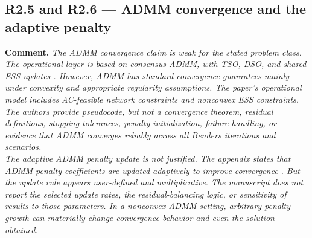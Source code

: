 \documentclass[11pt]{article}
\newcommand{\rcomment}[1]{\par\medskip\noindent\textbf{Comment.} \textit{#1}\par\smallskip}
\begin{document}
\subsection*{R2.5 and R2.6 --- ADMM convergence and the adaptive penalty}
\rcomment{
The ADMM convergence claim is weak for the stated problem class. The operational layer is based on consensus ADMM, with TSO, DSO, and shared ESS updates . However, ADMM has standard convergence guarantees mainly under convexity and appropriate regularity assumptions. The paper's operational model includes AC-feasible network constraints and nonconvex ESS constraints. The authors provide pseudocode, but not a convergence theorem, residual definitions, stopping tolerances, penalty initialization, failure handling, or evidence that ADMM converges reliably across all Benders iterations and scenarios.\\
The adaptive ADMM penalty update is not justified. The appendix states that ADMM penalty coefficients are updated adaptively to improve convergence . But the update rule appears user-defined and multiplicative. The manuscript does not report the selected update rates, the residual-balancing logic, or sensitivity of results to those parameters. In a nonconvex ADMM setting, arbitrary penalty growth can materially change convergence behavior and even the solution obtained.
}
\end{document}
